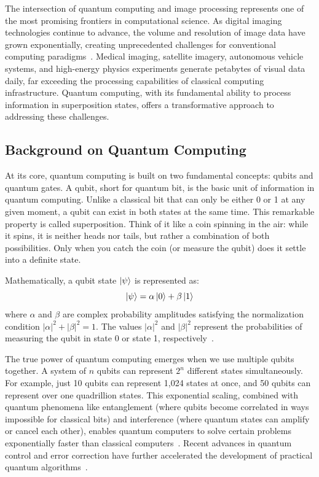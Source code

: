 \documentclass{ipol}
\begin{document}
The intersection of quantum computing and image processing represents one of the most promising frontiers in computational science. As digital imaging technologies continue to advance, the volume and resolution of image data have grown exponentially, creating unprecedented challenges for conventional computing paradigms~\cite{bib1}. Medical imaging, satellite imagery, autonomous vehicle systems, and high-energy physics experiments generate petabytes of visual data daily, far exceeding the processing capabilities of classical computing infrastructure. Quantum computing, with its fundamental ability to process information in superposition states, offers a transformative approach to addressing these challenges.

\subsection{Background on Quantum Computing}

At its core, quantum computing is built on two fundamental concepts: qubits and quantum gates. A qubit, short for quantum bit, is the basic unit of information in quantum computing. Unlike a classical bit that can only be either 0 or 1 at any given moment, a qubit can exist in both states at the same time. This remarkable property is called superposition. Think of it like a coin spinning in the air: while it spins, it is neither heads nor tails, but rather a combination of both possibilities. Only when you catch the coin (or measure the qubit) does it settle into a definite state.

Mathematically, a qubit state $\ket{\psi}$ is represented as:
\begin{equation}
\ket{\psi} = \alpha\ket{0} + \beta\ket{1}
\label{eq:qubit}
\end{equation}
where $\alpha$ and $\beta$ are complex probability amplitudes satisfying the normalization condition $|\alpha|^2 + |\beta|^2 = 1$. The values $|\alpha|^2$ and $|\beta|^2$ represent the probabilities of measuring the qubit in state 0 or state 1, respectively~\cite{bib2}.

The true power of quantum computing emerges when we use multiple qubits together. A system of $n$ qubits can represent $2^n$ different states simultaneously. For example, just 10 qubits can represent 1,024 states at once, and 50 qubits can represent over one quadrillion states. This exponential scaling, combined with quantum phenomena like entanglement (where qubits become correlated in ways impossible for classical bits) and interference (where quantum states can amplify or cancel each other), enables quantum computers to solve certain problems exponentially faster than classical computers~\cite{bib3,bib4}. Recent advances in quantum control and error correction have further accelerated the development of practical quantum algorithms~\cite{bib5,bib6,bib7,bib8}.
\end{document}
